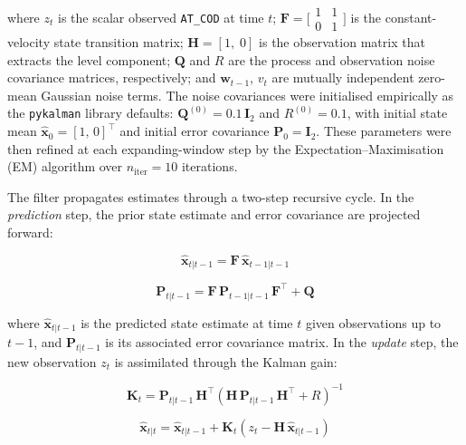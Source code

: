 \documentclass[conference]{IEEEtran}
\begin{document}
where $z_t$ is the scalar observed \texttt{AT\_COD} at time $t$; $\mathbf{F} = \bigl[\begin{smallmatrix}1&1\\0&1\end{smallmatrix}\bigr]$ is the constant-velocity state transition matrix; $\mathbf{H} = [1,\;0]$ is the observation matrix that extracts the level component; $\mathbf{Q}$ and $R$ are the process and observation noise covariance matrices, respectively; and $\mathbf{w}_{t-1}$, $v_t$ are mutually independent zero-mean Gaussian noise terms. The noise covariances were initialised empirically as the \texttt{pykalman} library defaults: $\mathbf{Q}^{(0)} = 0.1\,\mathbf{I}_2$ and $R^{(0)} = 0.1$, with initial state mean $\hat{\mathbf{x}}_0 = [1,\,0]^\top$ and initial error covariance $\mathbf{P}_0 = \mathbf{I}_2$. These parameters were then refined at each expanding-window step by the Expectation--Maximisation (EM) algorithm over $n_\text{iter}=10$ iterations.

The filter propagates estimates through a two-step recursive cycle. In the \emph{prediction} step, the prior state estimate and error covariance are projected forward:

\begin{equation}
    \hat{\mathbf{x}}_{t|t-1} = \mathbf{F}\,\hat{\mathbf{x}}_{t-1|t-1}
    \label{eq:kf_predict_state}
\end{equation}

\begin{equation}
    \mathbf{P}_{t|t-1} = \mathbf{F}\,\mathbf{P}_{t-1|t-1}\,\mathbf{F}^\top + \mathbf{Q}
    \label{eq:kf_predict_cov}
\end{equation}

where $\hat{\mathbf{x}}_{t|t-1}$ is the predicted state estimate at time $t$ given observations up to $t-1$, and $\mathbf{P}_{t|t-1}$ is its associated error covariance matrix. In the \emph{update} step, the new observation $z_t$ is assimilated through the Kalman gain:

\begin{equation}
    \mathbf{K}_t = \mathbf{P}_{t|t-1}\,\mathbf{H}^\top \!\left(\mathbf{H}\,\mathbf{P}_{t|t-1}\,\mathbf{H}^\top + R\right)^{-1}
    \label{eq:kf_gain}
\end{equation}

\begin{equation}
    \hat{\mathbf{x}}_{t|t} = \hat{\mathbf{x}}_{t|t-1} + \mathbf{K}_t\!\left(z_t - \mathbf{H}\,\hat{\mathbf{x}}_{t|t-1}\right)
    \label{eq:kf_update_state}
\end{equation}
\end{document}
